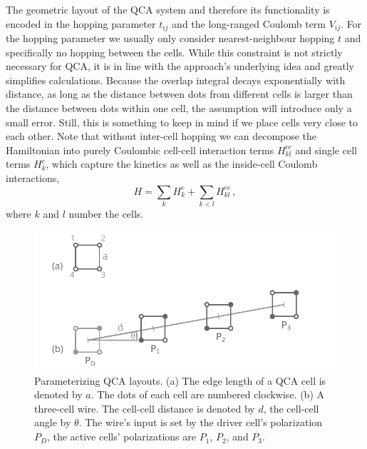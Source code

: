 The geometric layout of the QCA system and therefore its functionality is
encoded in the hopping parameter $t_{ij}$ and the long-ranged Coulomb term
$V_{ij}$. For the hopping parameter we usually only consider nearest-neighbour
hopping $t$ and specifically no hopping between the cells. While this constraint
is not strictly necessary for QCA, it is in line with the approach's underlying
idea and greatly simplifies calculations. Because the overlap integral decays
exponentially with distance, as long as the distance between dots from different
cells is larger than the distance between dots within one cell, the assumption
will introduce only a small error. Still, this is something to keep in mind if
we place cells very close to each other. Note that without inter-cell hopping we
can decompose the Hamiltonian into purely Coulombic cell-cell interaction terms
$H^{cc}_{kl}$ and single cell terms $H^c_k$, which capture the kinetics as well
as the inside-cell Coulomb interactions,
\begin{equation}
  \label{eq:H_cell}
  H = \sum_k H^c_k + \sum_{k<l} H^{cc}_{kl} \, ,
\end{equation}
where $k$ and $l$ number the cells. 

\begin{figure}
  \center
  \includegraphics{short_wire}
  \caption{Parameterizing QCA layouts. (a) The edge length of a QCA cell is
  denoted by $a$. The dots of each cell are numbered clockwise. (b) A
  three-cell wire. The cell-cell distance is denoted by $d$, the cell-cell angle
  by $\theta$. The wire's input is set by the driver cell's polarization $P_D$,
  the active cells' polarizations are $P_1$, $P_2$, and $P_3$.}
  \label{fig:short_wire}
\end{figure}

